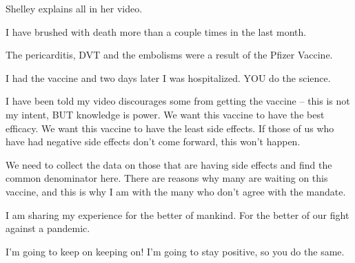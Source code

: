Shelley explains all in her video.

I have brushed with death more than a couple times in the last month.

The pericarditis, DVT and the embolisms were a result of the Pfizer Vaccine.

I had the vaccine and two days later I was hospitalized. YOU do the science.

I have been told my video discourages some from getting the vaccine – this is not my intent, BUT knowledge is power. We want this vaccine to have the best efficacy. We want this vaccine to have the least side effects. If those of us who have had negative side effects don’t come forward, this won’t happen.

We need to collect the data on those that are having side effects and find the common denominator here. There are reasons why many are waiting on this vaccine, and this is why I am with the many who don’t agree with the mandate.

I am sharing my experience for the better of mankind. For the better of our fight against a pandemic.

I’m going to keep on keeping on! I’m going to stay positive, so you do the same.

